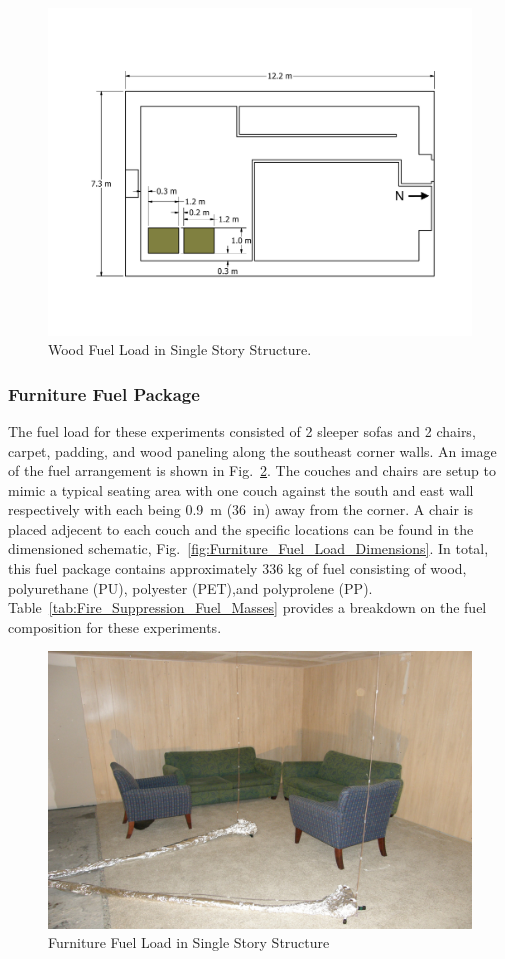 \documentclass[12pt,oneside]{book}
\begin{document}
\begin{figure}[!ht]
	\includegraphics[width=.8\columnwidth]{../Figures/Floor_Plans/PDFs/East_Structure/DelCo_2012_East_Structure_Pallets}
	\caption{Wood Fuel Load in Single Story Structure.}
	\label{fig:Wood_Fuel_Load_Dimensions}
\end{figure}

\subsubsection{Furniture Fuel Package}
\label{sec:fire_suppression_furniture_fuel}

The fuel load for these experiments consisted of 2 sleeper sofas and 2 chairs, carpet, padding, and wood paneling along the southeast corner walls. An image of the fuel arrangement is shown in Fig.~\ref{fig:Furniture_Fuel_Load}. The couches and chairs are setup to mimic a typical seating area with one couch against the south and east wall respectively with each being 0.9~m (36~in) away from the corner. A chair is placed adjecent to each couch and the specific locations can be found in the dimensioned schematic, Fig.~\ref{fig:Furniture_Fuel_Load_Dimensions}. In total, this fuel package contains approximately 336 kg of fuel consisting of wood, polyurethane (PU), polyester (PET),and polyprolene (PP). Table~\ref{tab:Fire_Suppression_Fuel_Masses} provides a breakdown on the fuel composition for these experiments.

\begin{figure}[!ht]
	\includegraphics[width=.8\columnwidth]{../Figures/Pictures/Furniture_Fuel_Load}
	\caption{Furniture Fuel Load in Single Story Structure}
	\label{fig:Furniture_Fuel_Load}
\end{figure}
\end{document}
